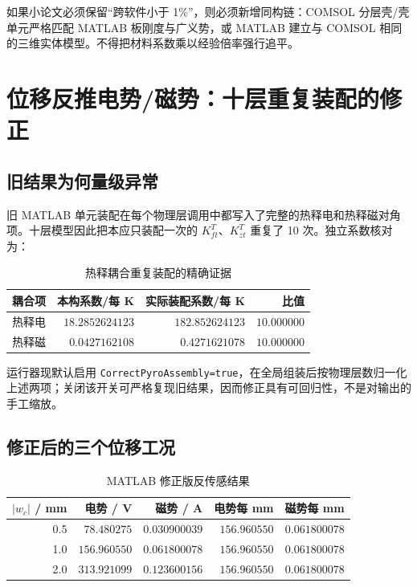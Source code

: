 \documentclass[UTF8,fontset=windows,11pt,a4paper]{ctexart}
\begin{document}
如果小论文必须保留“跨软件小于 1\%”，则必须新增同构链：COMSOL 分层壳/壳单元严格匹配 MATLAB 板刚度与广义势，或 MATLAB 建立与 COMSOL 相同的三维实体模型。不得把材料系数乘以经验倍率强行追平。

\section{位移反推电势/磁势：十层重复装配的修正}

\subsection{旧结果为何量级异常}

旧 MATLAB 单元装配在每个物理层调用中都写入了完整的热释电和热释磁对角项。十层模型因此把本应只装配一次的 $K_{ft}^{T}$、$K_{zt}^{T}$ 重复了 10 次。独立系数核对为：

\begin{table}[H]
\centering
\caption{热释耦合重复装配的精确证据}
\small
\begin{tabular}{lrrr}
\toprule
耦合项 & 本构系数/每 K & 实际装配系数/每 K & 比值 \\
\midrule
热释电 & $18.2852624123$ & $182.852624123$ & $10.000000$ \\
热释磁 & $0.0427162108$ & $0.4271621078$ & $10.000000$ \\
\bottomrule
\end{tabular}
\end{table}

运行器现默认启用 \texttt{CorrectPyroAssembly=true}，在全局组装后按物理层数归一化上述两项；关闭该开关可严格复现旧结果，因而修正具有可回归性，不是对输出的手工缩放。

\subsection{修正后的三个位移工况}

\begin{table}[H]
\centering
\caption{MATLAB 修正版反传感结果}
\small
\begin{tabular}{rrrrr}
\toprule
$|w_c|$ / mm & 电势 / V & 磁势 / A & 电势每 mm & 磁势每 mm \\
\midrule
0.5 & $78.480275$ & $0.030900039$ & $156.960550$ & $0.061800078$ \\
1.0 & $156.960550$ & $0.061800078$ & $156.960550$ & $0.061800078$ \\
2.0 & $313.921099$ & $0.123600156$ & $156.960550$ & $0.061800078$ \\
\bottomrule
\end{tabular}
\end{table}
\end{document}

